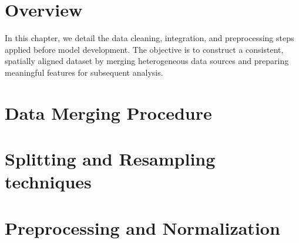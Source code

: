 \section{Overview}

In this chapter, we detail the data cleaning, integration, and preprocessing steps applied before model development. 
The objective is to construct a consistent, spatially aligned dataset by merging heterogeneous data sources and preparing meaningful features for subsequent analysis.

\section{Data Merging Procedure}
% 
\section{Splitting and Resampling techniques}
% 

\section {Preprocessing and Normalization}
% 